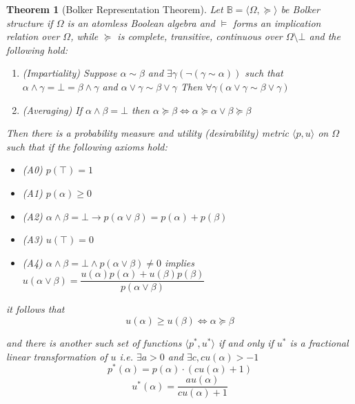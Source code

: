 \documentclass{tufte-handout}
\newtheorem{theo}[section]{Theorem}
\newenvironment{ftheo}[1]
  {\begin{mdframed}
  \sloppy
  \begin{theo}[#1]
  }
  {\end{theo}
\end{mdframed}}
\begin{document}
\begin{ftheo}{Bolker Representation Theorem}
\label{section:BolkersRepresentation}
Let $ \mathbb{B} =  \langle \Omega, \succeq \rangle $ be Bolker structure if $\Omega$ is an atomless Boolean algebra and $\models$ forms an implication relation over $\Omega$, while $\succeq$ is complete, transitive, continuous over $\Omega \setminus \bot$ and the following hold: 
\begin{enumerate}
\item (Impartiality) Suppose $\alpha \sim \beta $ and $\exists \gamma (\neg(\gamma \sim \alpha))$ such that  $\alpha \wedge \gamma = \bot = \beta \wedge \gamma$ and $\alpha \vee \gamma \sim \beta \vee \gamma $ Then $ \forall \gamma ( \alpha \vee \gamma \sim \beta \vee \gamma )$ 
\item (Averaging) If $\alpha \wedge \beta = \bot$ then $\alpha \succeq \beta \Leftrightarrow \alpha \succeq \alpha \vee \beta \succeq \beta$
\end{enumerate}
Then there is a probability measure and utility (desirability) metric $\langle p, u \rangle$ on $\Omega$ such that if the following axioms hold:
\begin{itemize}
\item (A0) $p(\top) = 1$
\item (A1) $p(\alpha) \geq 0$
\item (A2) $\alpha \wedge \beta = \bot \rightarrow p(\alpha \vee \beta) = p(\alpha) + p(\beta)$
\item (A3) $u(\top) = 0$
\item (A4) ${\alpha \wedge \beta = \bot \wedge p(\alpha \vee \beta) \neq 0}$  implies  ${u(\alpha \vee \beta) = \dfrac{u(\alpha)p(\alpha) + u(\beta)p(\beta)}{p(\alpha \vee \beta)} }$
\end{itemize}
it follows that
$$  u(\alpha) \geq u(\beta) \Leftrightarrow \alpha \succeq \beta $$

and there is another such set of functions $\langle p^{*}, u^{*}    \rangle$ if and only if $u^{*}$ is a fractional linear transformation of $u$ i.e. ${ \exists a > 0}$ and ${\exists c , cu(\alpha) > -1}$
$$ p^{*}(\alpha) = p(\alpha) \cdot (cu(\alpha) + 1) $$
$$u^{*}(\alpha) = \frac{au(\alpha)}{cu(\alpha)+1} $$
\end{ftheo}
\end{document}
